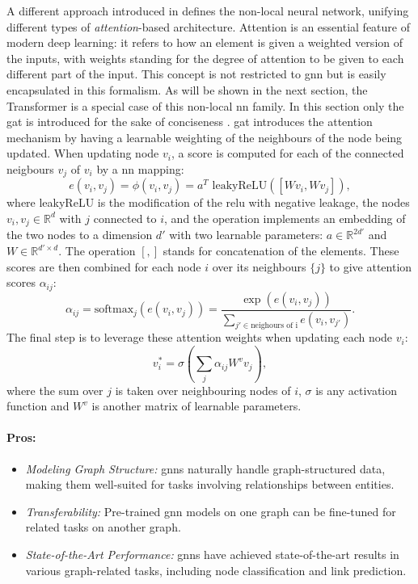 A different approach introduced in \cite{nlnnPaper} defines the non-local neural network, unifying different types of \textit{attention}-based architecture. Attention is an essential feature of modern deep learning: it refers to how an element is given a weighted version of the inputs, with weights standing for the degree of attention to be given to each different part of the input. This concept is not restricted to \gls{gnn} but is easily encapsulated in this formalism. As will be shown in the next section, the Transformer is a special case of this non-local \gls{nn} family. In this section only the \gls{gat} is introduced for the sake of conciseness \cite{velickovic2018graph}. \gls{gat} introduces the attention mechanism by having a learnable weighting of the neighbours of the node being updated. When updating node $v_i$, a score is computed for each of the connected neigbours $v_j$ of $v_i$ by a \gls{nn} mapping: \[e(v_i, v_j) = \phi(v_i, v_j) = a^T \text{ leakyReLU}([W v_i, Wv_j]),\] where leakyReLU is the modification of the \gls{relu} with negative leakage, the nodes $v_i, v_j \in \mathbb{R}^d$ with $j$ connected to $i$, and the operation implements an embedding of the two nodes to a dimension $d'$ with two learnable parameters: $a \in \mathbb{R}^{2d'}$ and $W \in \mathbb{R}^{d' \times d}$. The operation $[,]$ stands for concatenation of the elements. These scores are then combined for each node $i$ over its neighbours $\{j\}$ to give attention scores $\alpha_{ij}$: \[ \alpha_{ij} = \text{softmax}_j (e(v_i, v_j)) = \frac{\exp(e(v_i, v_j))}{\sum_{j' \in \text{neighours of i}}e(v_i, v_{j'})}.\] The final step is to leverage these attention weights when updating each node $v_i$: \[v^*_i = \sigma\left(\sum_{j} \alpha_{ij} W^v v_j \right),\] where the sum over $j$ is taken over neighbouring nodes of $i$, $\sigma$ is any activation function and $W^v$ is another matrix of learnable parameters.\\

\paragraph{Pros:}
\begin{itemize}
    \item \textit{Modeling Graph Structure:} \gls{gnn}s naturally handle graph-structured data, making them well-suited for tasks involving relationships between entities.
    \item \textit{Transferability:} Pre-trained \gls{gnn} models on one graph can be fine-tuned for related tasks on another graph.
    \item \textit{State-of-the-Art Performance:} \gls{gnn}s have achieved state-of-the-art results in various graph-related tasks, including node classification and link prediction.
\end{itemize}

